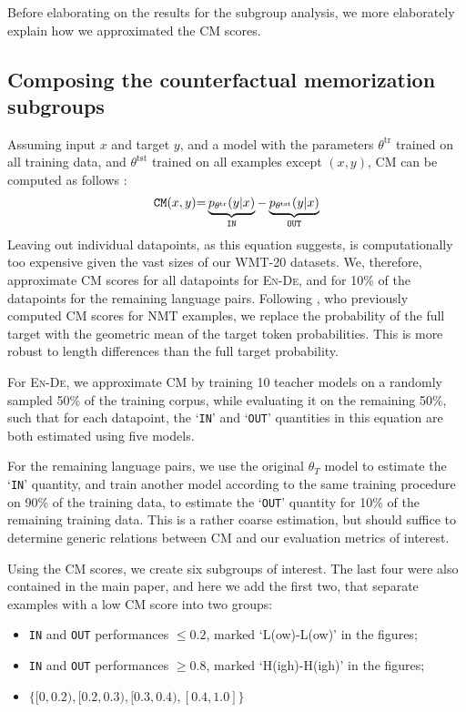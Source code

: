 Before elaborating on the results for the subgroup analysis, we more elaborately explain how we approximated the CM scores.

\subsection{Composing the counterfactual memorization subgroups}
\label{ap:cm}
Assuming input $x$ and target $y$, and a model with the parameters $\theta^{\text{tr}}$ trained on all training data, and $\theta^{\text{tst}}$ trained on all examples except $(x,y)$, CM can be computed as follows \citep{feldman2020does,feldman2020what}:
\begin{equation*}
\vspace{-0.1cm}
    \texttt{CM}(x, y) {=} \underbrace{p_{\theta^{\text{tr}}}(y|x)}_{\texttt{IN}} - \underbrace{p_{\theta^{\text{tst}}}(y|x)}_{\texttt{OUT}}
\end{equation*}
Leaving out individual datapoints, as this equation suggests, is computationally too expensive given the vast sizes of our WMT-20 datasets.
We, therefore, approximate CM scores for all datapoints for \textsc{En}-\textsc{De}, and for 10\% of the datapoints for the remaining language pairs. Following \citet[][p.3]{dankers2023memorisation}, who previously computed CM scores for NMT examples, we replace the probability of the full target with the geometric mean of the target token probabilities.
This is more robust to length differences than the full target probability.

For \textsc{En}-\textsc{De}, we approximate CM by training 10 teacher models on a randomly sampled 50\% of the training corpus, while evaluating it on the remaining 50\%, such that for each datapoint, the `\texttt{IN}' and `\texttt{OUT}' quantities in this equation are both estimated using five models.

For the remaining language pairs, we use the original $\theta_T$ model to estimate the `\texttt{IN}' quantity, and train another model according to the same training procedure on 90\% of the training data, to estimate the `\texttt{OUT}' quantity for 10\% of the remaining training data. This is a rather coarse estimation, but should suffice to determine generic relations between CM and our evaluation metrics of interest.

Using the CM scores, we create six subgroups of interest. The last four were also contained in the main paper, and here we add the first two, that separate examples with a low CM score into two groups:
\begin{itemize}[noitemsep, topsep=0pt]
    \item \texttt{IN} and \texttt{OUT} performances $\leq0.2$, marked `L(ow)-L(ow)' in the figures;
    \item \texttt{IN} and \texttt{OUT} performances $\geq0.8$, marked `H(igh)-H(igh)' in the figures;
    \item $\{[0, 0.2), [0.2, 0.3), [0.3, 0.4), [0.4, 1.0]\}$ 
\end{itemize}

